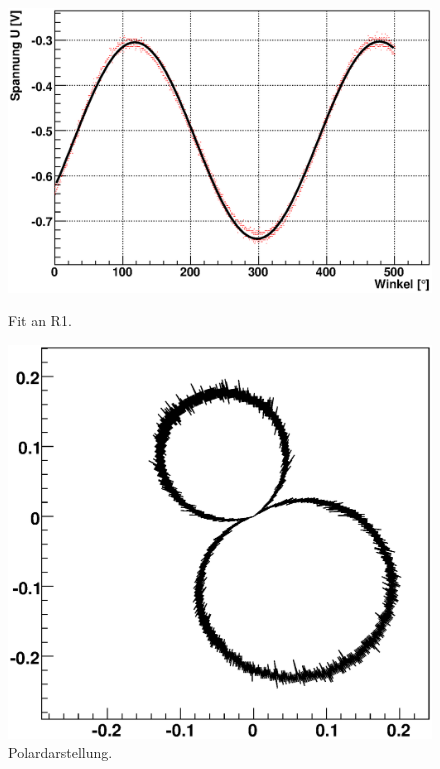 \documentclass[12pt]{article}
\begin{document}
\begin{figure}[H]  
\begin{minipage}{0.49\linewidth}
\centering
\includegraphics[width=0.9\linewidth]{pictures/R1.eps}
\caption{Fit an R1.}
\end{minipage}
\begin{minipage}{0.5\linewidth}
\centering 
\includegraphics[width=0.9\linewidth]{pictures/R1vd.eps}
\caption{Polardarstellung.}
\end{minipage}
\end{figure}
\end{document}
